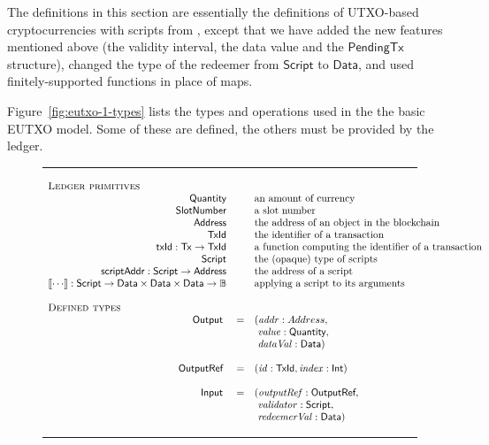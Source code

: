 \documentclass[a4paper]{article}
\newcommand{\s}{\textsf}  %
\newcommand{\msf}[1]{\ensuremath{\mathsf{#1}}}
\newcommand{\mi}[1]{\ensuremath{\mathit{#1}}}
\newcommand\rfskip{7pt}
\newenvironment{ruledfigure}[1]{\begin{figure}[#1]\hrule\vspace{\rfskip}}{\vspace{\rfskip}\hrule\end{figure}}
\newcommand{\script}{\ensuremath{\s{Script}}}
\newcommand{\scriptAddr}{\msf{scriptAddr}}
\newcommand{\ptx}{\ensuremath{\s{PendingTx}}}
\newcommand{\TxId}{\ensuremath{\s{TxId}}}
\newcommand{\txId}{\msf{txId}}
\newcommand{\txrefid}{\mi{id}}
\newcommand{\Address}{\ensuremath{\s{Address}}}
\newcommand{\idx}{\mi{index}}
\newcommand{\addr}{\mi{addr}}
\newcommand{\val}{\mi{value}}  %
\newcommand{\validator}{\mi{validator}}
\newcommand{\redeemerval}{\mi{redeemerVal}}
\newcommand{\dataval}{\mi{dataVal}}
\newcommand{\Data}{\ensuremath{\s{Data}}}
\newcommand{\outputref}{\mi{outputRef}}
\newcommand{\slotnum}{\ensuremath{\s{SlotNumber}}}
\newcommand{\eutxotx}{\msf{Tx}}
\newcommand{\qty}{\ensuremath{\s{Quantity}}}
\newcommand\B{\ensuremath{\mathbb{B}}}
\begin{document}
The definitions in this section are essentially the definitions of
UTXO-based cryptocurrencies with scripts from
\citep{Zahnentferner18-UTxO}, except that we have added the new
features mentioned above (the validity interval, the data value
and the \ptx{} structure), changed the type of the redeemer from
\script{} to \Data{}, and used finitely-supported functions in place
of maps.

Figure~\ref{fig:eutxo-1-types} lists the types and operations used in the
the basic EUTXO model. Some of these are defined, the others must be provided by
the ledger.
\begin{ruledfigure}{H}
  \begin{displaymath}
  \begin{array}{rll}
    \multicolumn{3}{l}{\textsc{Ledger primitives}}\\
    \qty{} && \mbox{an amount of currency}\\
    \slotnum && \mbox{a slot number}\\
    \Address && \mbox{the address of an object in the blockchain}\\
    \TxId && \mbox{the identifier of a transaction}\\
    \txId : \eutxotx \rightarrow \TxId && \mbox{a function computing the identifier of a transaction}\\
    \script && \mbox{the (opaque) type of scripts}\\
    \scriptAddr : \script \rightarrow \Address && \mbox{the address of a script}\\
    \llbracket \cdots \rrbracket : \script \rightarrow \Data \times \Data \times
    \Data \rightarrow \B && \mbox{applying a script to its arguments}\\
    \\
    \multicolumn{3}{l}{\textsc{Defined types}}\\
    \s{Output } &=&(\addr: Address,\\
                & &\ \val: \qty,\\
                & &\ \dataval: \Data)\\
    \\
    \s{OutputRef } &=&(\txrefid: \TxId, \idx: \s{Int})\\
    \\
    \s{Input } &=&(\outputref: \s{OutputRef},\\
               & &\ \validator: \script,\\
               & &\ \redeemerval: \Data)\\

\end{array}
\end{displaymath}
\end{ruledfigure}
\end{document}
